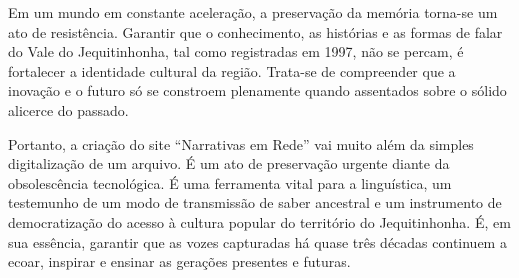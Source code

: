 \documentclass[portuguese]{textolivre}
\begin{document}
Em um mundo em constante aceleração, a preservação da memória torna-se um ato de resistência. Garantir que o conhecimento, as histórias e as formas de falar do Vale do Jequitinhonha, tal como registradas em 1997, não se percam, é fortalecer a identidade cultural da região. Trata-se de compreender que a inovação e o futuro só se constroem plenamente quando assentados sobre o sólido alicerce do passado.

Portanto, a criação do site “Narrativas em Rede” vai muito além da simples digitalização de um arquivo. É um ato de preservação urgente diante da obsolescência tecnológica. É uma ferramenta vital para a linguística, um testemunho de um modo de transmissão de saber ancestral e um instrumento de democratização do acesso à cultura popular do território do Jequitinhonha. É, em sua essência, garantir que as vozes capturadas há quase três décadas continuem a ecoar, inspirar e ensinar as gerações presentes e futuras.

\printbibliography\label{sec-bib}


\begin{dataavailability}
\end{dataavailability}
\end{document}
